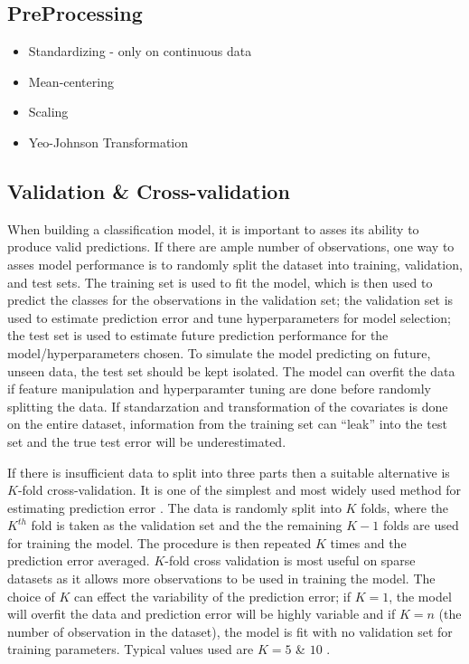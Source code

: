 \documentclass[12pt,]{article}
\providecommand{\tightlist}{%
  \setlength{\itemsep}{0pt}\setlength{\parskip}{0pt}}
\begin{document}
\subsection{PreProcessing}\label{preprocessing}

\begin{itemize}
\tightlist
\item
  Standardizing - only on continuous data
\item
  Mean-centering
\item
  Scaling
\item
  Yeo-Johnson Transformation
\end{itemize}

\subsection{Validation \&
Cross-validation}\label{validation-cross-validation}

When building a classification model, it is important to asses its
ability to produce valid predictions. If there are ample number of
observations, one way to asses model performance is to randomly split
the dataset into training, validation, and test sets. The training set
is used to fit the model, which is then used to predict the classes for
the observations in the validation set; the validation set is used to
estimate prediction error and tune hyperparameters for model selection;
the test set is used to estimate future prediction performance for the
model/hyperparameters chosen. To simulate the model predicting on
future, unseen data, the test set should be kept isolated. The model can
overfit the data if feature manipulation and hyperparamter tuning are
done before randomly splitting the data. If standarzation and
transformation of the covariates is done on the entire dataset,
information from the training set can ``leak'' into the test set and the
true test error will be underestimated.

If there is insufficient data to split into three parts then a suitable
alternative is \(K\)-fold cross-validation. It is one of the simplest
and most widely used method for estimating prediction error
\citep{hastie_elements_2009}. The data is randomly split into \(K\)
folds, where the \(K^{th}\) fold is taken as the validation set and the
the remaining \(K-1\) folds are used for training the model. The
procedure is then repeated \(K\) times and the prediction error
averaged. \(K\)-fold cross validation is most useful on sparse datasets
as it allows more observations to be used in training the model. The
choice of \(K\) can effect the variability of the prediction error; if
\(K=1\), the model will overfit the data and prediction error will be
highly variable and if \(K=n\) (the number of observation in the
dataset), the model is fit with no validation set for training
parameters. Typical values used are \(K=5\) \& \(10\)
\citep{hastie_elements_2009}.
\end{document}
